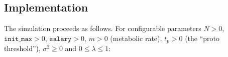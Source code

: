 \documentclass[sigconf]{acmart}
\begin{document}
\subsection{Implementation}



The simulation proceeds as follows. For configurable parameters
$N > 0$,
$\texttt{init\_max} > 0$,
$\texttt{salary} > 0$,
$m > 0$ (metabolic rate),
$t_p > 0$ (the ``proto threshold''),
$\sigma^2 \ge 0$ and
$0 \le \lambda \le 1$:
\end{document}

